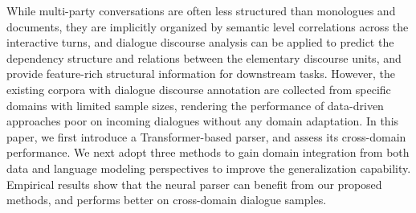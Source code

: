 While multi-party conversations are often less structured than monologues and documents, they are implicitly organized by semantic level correlations across the interactive turns, and dialogue discourse analysis can be applied to predict the dependency structure and relations between the elementary discourse units, and provide feature-rich structural information for downstream tasks. However, the existing corpora with dialogue discourse annotation are collected from specific domains with limited sample sizes, rendering the performance of data-driven approaches poor on incoming dialogues without any domain adaptation. In this paper, we first introduce a Transformer-based parser, and assess its cross-domain performance. We next adopt three methods to gain domain integration from both data and language modeling perspectives to improve the generalization capability. Empirical results show that the neural parser can benefit from our proposed methods, and performs better on cross-domain dialogue samples.
